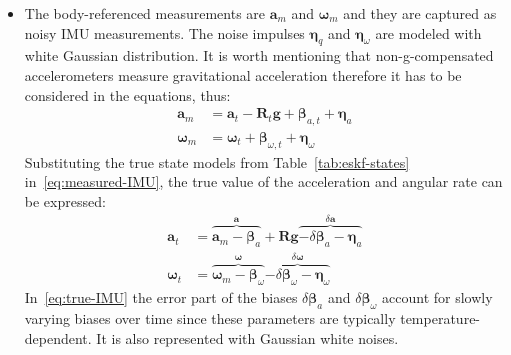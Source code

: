 \begin{itemize}
    \item 
    The body-referenced measurements are $\mathbf{a}_m$ and $\boldsymbol{\omega}_m$ and they are captured as noisy IMU measurements. The noise impulses $\boldsymbol{\eta}_q$ and $\boldsymbol{\eta}_\omega$ are modeled with white Gaussian distribution. It is worth mentioning that non-g-compensated accelerometers measure gravitational acceleration therefore it has to be considered in the equations, thus:  
    \begin{equation}
    \begin{aligned}
        \mathbf{a}_m&=\mathbf{a}_t-\mathbf{R}_t\mathbf{g}+\boldsymbol{\beta}_{a,t}+\boldsymbol{\eta}_a \\
        \boldsymbol{\omega}_m&=\boldsymbol{\omega}_t+\boldsymbol{\beta}_{\omega, t}+\boldsymbol{\eta}_\omega
    \end{aligned}
    \label{eq:measured-IMU}
    \end{equation}
    Substituting the true state models from Table~\ref{tab:eskf-states} in~\eqref{eq:measured-IMU}, the true value of the acceleration and angular rate can be expressed:
    \begin{equation}
    \begin{aligned}
        \mathbf{a}_t&=\overbrace{\mathbf{a}_m-\boldsymbol{\beta}_a}^\mathbf{a}+ \mathbf{Rg} \overbrace{-\delta\boldsymbol{\beta}_a-\boldsymbol{\eta}_a}^{\delta\mathbf{a}} \\
        \boldsymbol{\omega}_t&=\overbrace{\boldsymbol{\omega}_m-\boldsymbol{\beta}_\omega}^{\boldsymbol{\omega}}\overbrace{-\delta\boldsymbol{\beta}_\omega-\boldsymbol{\eta}_\omega}^{\delta\boldsymbol{\omega}}
    \end{aligned}
    \label{eq:true-IMU}
    \end{equation}
    In~\eqref{eq:true-IMU} the error part of the biases $\delta\boldsymbol{\beta}_a$ and $\delta\boldsymbol{\beta}_\omega$ account for slowly varying biases over time since these parameters are typically temperature-dependent. It is also represented with Gaussian white noises.


\end{itemize}
